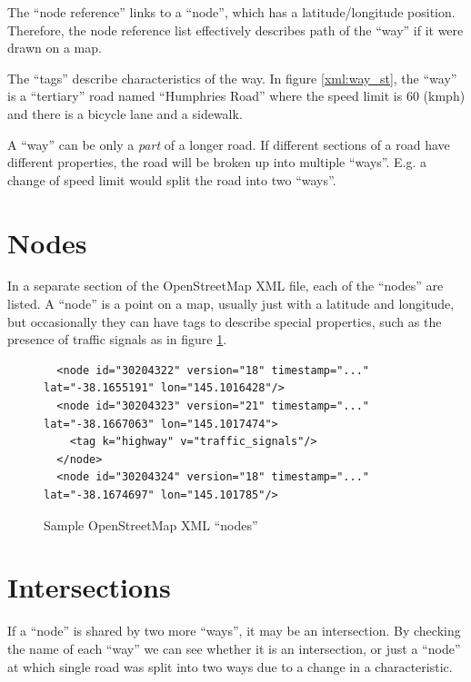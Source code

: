 \documentclass[11pt,twoside]{report}
\begin{document}
The ``node reference'' links to a ``node'', which has a latitude/longitude position.  Therefore, the node reference list effectively describes path of the ``way'' if it were drawn on a map.

The ``tags'' describe characteristics of the way.  In figure \ref{xml:way_st}, the ``way'' is a ``tertiary'' road named ``Humphries Road'' where the speed limit is 60 (kmph) and there is a bicycle lane and a sidewalk.

A ``way'' can be only a \textit{part} of a longer road.  If different sections of a road have different properties, the road will be broken up into multiple ``ways''.  E.g. a change of speed limit would split the road into two ``ways''.

\clearpage
\section{Nodes}
\label{osm:nodes}

In a separate section of the OpenStreetMap XML file, each of the ``nodes'' are listed.  A ``node'' is a point on a map, usually just with a latitude and longitude, but occasionally they can have tags to describe special properties, such as the presence of traffic signals as in figure \ref{xml:way_nodes}.\\

\begin{figure}[h]
\centering
\begin{verbatim}
  <node id="30204322" version="18" timestamp="..." lat="-38.1655191" lon="145.1016428"/>
  <node id="30204323" version="21" timestamp="..." lat="-38.1667063" lon="145.1017474">
    <tag k="highway" v="traffic_signals"/>
  </node>
  <node id="30204324" version="18" timestamp="..." lat="-38.1674697" lon="145.101785"/>	
\end{verbatim}
\caption{Sample OpenStreetMap XML ``nodes''}
\label{xml:way_nodes}
\end{figure}

\section{Intersections}
\label{osm:intersections}

If a ``node'' is shared by two more ``ways'', it may be an intersection.  By checking the name of each ``way'' we can see whether it is an intersection, or just a ``node'' at which single road was split into two ways due to a change in a characteristic.
\end{document}

